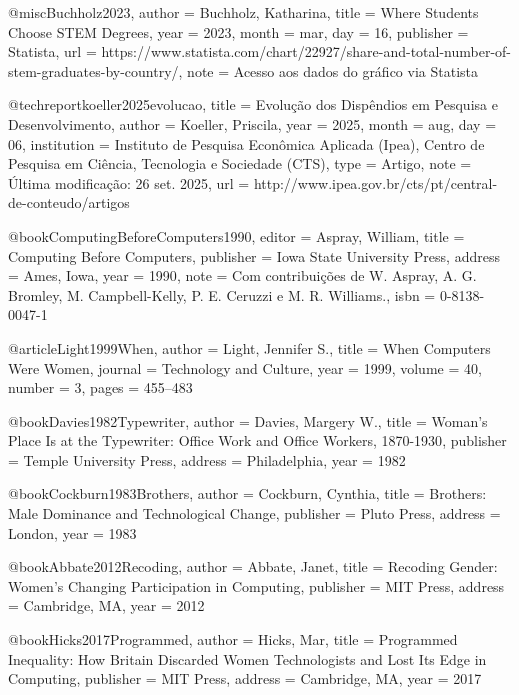 {@misc{Buchholz2023,
  author    = {Buchholz, Katharina},
  title     = {Where Students Choose STEM Degrees},
  year      = {2023},
  month     = {mar},
  day       = {16},
  publisher = {Statista},
  url       = {https://www.statista.com/chart/22927/share-and-total-number-of-stem-graduates-by-country/},
  note      = {Acesso aos dados do gráfico via Statista}
}

@techreport{koeller2025evolucao,
  title       = {Evolução dos Dispêndios em Pesquisa e Desenvolvimento},
  author      = {Koeller, Priscila},
  year        = {2025},
  month       = {aug},
  day         = {06},
  institution = {Instituto de Pesquisa Econômica Aplicada (Ipea), Centro de Pesquisa em Ciência, Tecnologia e Sociedade (CTS)},
  type        = {Artigo},
  note        = {Última modificação: 26 set. 2025},
  url         = {http://www.ipea.gov.br/cts/pt/central-de-conteudo/artigos}
}

@book{ComputingBeforeComputers1990,
  editor    = {Aspray, William},
  title     = {Computing Before Computers},
  publisher = {Iowa State University Press},
  address   = {Ames, Iowa},
  year      = {1990},
  note      = {Com contribuições de W. Aspray, A. G. Bromley, M. Campbell-Kelly, P. E. Ceruzzi e M. R. Williams.},
  isbn      = {0-8138-0047-1}
}

@article{Light1999When,
  author = {Light, Jennifer S.},
  title = {When Computers Were Women},
  journal = {Technology and Culture},
  year = {1999},
  volume = {40},
  number = {3},
  pages = {455--483}
}

@book{Davies1982Typewriter,
  author = {Davies, Margery W.},
  title = {Woman's Place Is at the Typewriter: Office Work and Office Workers, 
           1870-1930},
  publisher = {Temple University Press},
  address = {Philadelphia},
  year = {1982}
}

@book{Cockburn1983Brothers,
  author = {Cockburn, Cynthia},
  title = {Brothers: Male Dominance and Technological Change},
  publisher = {Pluto Press},
  address = {London},
  year = {1983}
}

@book{Abbate2012Recoding,
  author = {Abbate, Janet},
  title = {Recoding Gender: Women's Changing Participation in Computing},
  publisher = {MIT Press},
  address = {Cambridge, MA},
  year = {2012}
}

@book{Hicks2017Programmed,
  author = {Hicks, Mar},
  title = {Programmed Inequality: How Britain Discarded Women Technologists 
           and Lost Its Edge in Computing},
  publisher = {MIT Press},
  address = {Cambridge, MA},
  year = {2017}
}

}
